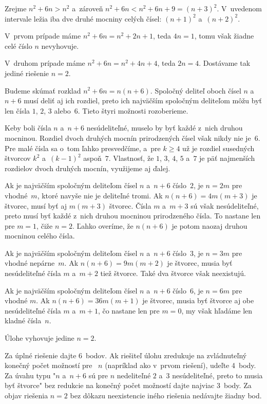 {%
Zrejme $n^2+6n > n^2$ a~zároveň $n^2+6n < n^2+6n+9 = (n+3)^2$. V~uvedenom intervale ležia iba dve druhé mocniny celých čísel:
$(n+1)^2$ a~$(n+2)^2$.

V~prvom prípade máme $n^2+6n = n^2+2n+1$, teda $4n = 1$, tomu však žiadne
celé číslo $n$ nevyhovuje.

V~druhom prípade máme $n^2+6n = n^2+4n+4$, teda $2n = 4$. Dostávame tak jediné
riešenie $n=2$.

\ineriesenie
Budeme skúmať rozklad $n^2+6n = n(n+6)$.
Spoločný deliteľ oboch čísel $n$ a~$n+6$ musí deliť aj ich rozdiel, preto
ich najväčším spoločným deliteľom môžu byť len čísla $1$, $2$, $3$ alebo~$6$.
Tieto štyri možnosti rozoberieme.

Keby boli čísla $n$ a~$n+6$ nesúdeliteľné, muselo by byť každé z~nich
druhou mocninou. Rozdiel dvoch druhých mocnín prirodzených čísel však nikdy nie je~$6$.
Pre malé čísla sa o~tom ľahko presvedčíme, a~pre $k\ge4$ už je rozdiel
susedných štvorcov $k^2$ a~$(k-1)^2$ aspoň~$7$. Vlastnosť, že $1$, $3$, $4$, $5$ a~$7$ je
päť najmenších rozdielov dvoch druhých mocnín, využijeme aj ďalej.

Ak je najväčším spoločným deliteľom čísel $n$ a~$n+6$ číslo~$2$, je
$n = 2m$ pre vhodné~$m$, ktoré navyše nie je
deliteľné tromi. Ak $n(n+6) = 4m(m+3)$ je štvorec, musí byť aj $m(m+3)$
štvorec. Čísla $m$ a~$m+3$ sú však nesúdeliteľné, preto musí byť každé z~nich
druhou mocninou prirodzeného čísla.
To nastane len pre $m =1$, čiže $n = 2$. Ľahko overíme, že $n(n+6)$
je potom naozaj druhou mocninou celého čísla.

Ak je najväčším spoločným deliteľom čísel $n$ a~$n+6$ číslo~$3$, je
$n = 3m$ pre vhodné nepárne~$m$. Ak $n(n+6)
= 9m(m+2)$ je štvorec, musia byť nesúdeliteľné čísla $m$ a~$m+2$ tiež
štvorce. Také dva štvorce však neexistujú.

Ak je najväčším spoločným deliteľom čísel $n$ a~$n+6$ číslo~$6$, je
$n = 6m$ pre vhodné $m$. Ak $n(n+6) =
36m(m+1)$ je štvorec, musia byť štvorce aj obe nesúdeliteľné čísla $m$ a~$m+1$,
čo nastane len pre $m = 0$, my však hľadáme len kladné čísla~$n$.

Úlohe vyhovuje jedine $n = 2$.


\nobreak\medskip\petit\noindent
Za úplné riešenie dajte 6~bodov.
Ak riešiteľ úlohu zredukuje na zvládnuteľný konečný počet možností pre~
$n$ (napríklad ako v~prvom riešení), udeľte 4~body.
Za úvahu typu "$n$ a~$n+6$ sú pre $n$ nedeliteľné $2$ a~$3$ nesúdeliteľné,
preto to musia byť štvorce" bez redukcie na konečný počet možností dajte najviac
3~body.
Za objav riešenia $n=2$ bez dôkazu neexistencie iného riešenia nedávajte žiadny bod.
\endpetit
\bigbreak
}

